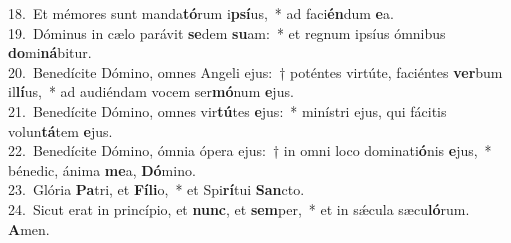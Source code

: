 {18.~}Et mémores sunt manda\textbf{tó}rum i\textbf{psí}us,~* ad faci\textbf{én}dum \textbf{e}a.\\
{19.~}Dóminus in cælo parávit \textbf{se}dem \textbf{su}am:~* et regnum ipsíus ómnibus \textbf{do}mi\textbf{ná}bitur.\\
{20.~}Benedícite Dómino, omnes Angeli ejus:~† poténtes virtúte, faciéntes \textbf{ver}bum il\textbf{lí}us,~* ad audiéndam vocem ser\textbf{mó}num \textbf{e}jus.\\
{21.~}Benedícite Dómino, omnes vir\textbf{tú}tes \textbf{e}jus:~* minístri ejus, qui fácitis volun\textbf{tá}tem \textbf{e}jus.\\
{22.~}Benedícite Dómino, ómnia ópera ejus:~† in omni loco dominati\textbf{ó}nis \textbf{e}jus,~* bénedic, ánima \textbf{me}a, \textbf{Dó}mino.\\
{23.~}Glória \textbf{Pa}tri, et \textbf{Fí}\textbf{li}o,~* et Spi\textbf{rí}tui \textbf{San}cto.\\
{24.~}Sicut erat in princípio, et \textbf{nunc}, et \textbf{sem}per,~* et in sǽcula sæcu\textbf{ló}rum. \textbf{A}men.\\
